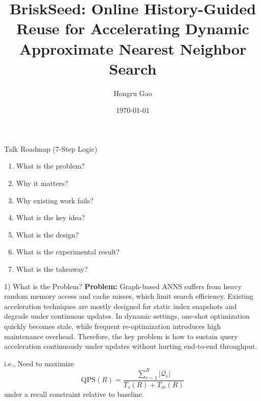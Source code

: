 \documentclass[10pt,aspectratio=169]{beamer}
\title[\system]{BriskSeed: Online History-Guided Reuse for Accelerating Dynamic Approximate Nearest Neighbor Search}
\author{Hongru Gao}
\institute{Huazhong University of Science and Technology (HUST)}
\date{\today}
\begin{document}
\begin{frame}
  \titlepage
\end{frame}

\begin{frame}{Talk Roadmap (7-Step Logic)}
  \begin{enumerate}
    \item What is the problem?
    \item Why it matters?
    \item Why existing work fails?
    \item What is the key idea?
    \item What is the design?
    \item What is the experimental result?
    \item What is the takeaway?
  \end{enumerate}
\end{frame}

\begin{frame}{1) What is the Problem?}
  \textbf{Problem:}
  \vspace{0.5em}
  Graph-based ANNS suffers from heavy random memory access and cache misses, which limit search efficiency. 
  Existing acceleration techniques are mostly designed for static index snapshots and degrade under continuous 
  updates. In dynamic settings, one-shot optimization quickly becomes stale, while frequent re-optimization 
  introduces high maintenance overhead. Therefore, the key problem is how to sustain query acceleration continuously 
  under updates without hurting end-to-end throughput.
  
  i.e., Need to maximize
    \[
      \mathrm{QPS}(R)=\frac{\sum_{r=1}^{R}|\mathcal{Q}_r|}{T_s(R)+T_m(R)}
    \]
    under a recall constraint relative to baseline.

  \vspace{0.3em}
\end{frame}
\end{document}
